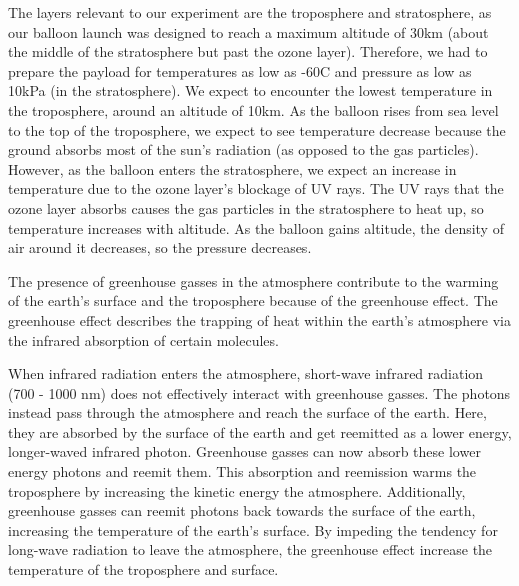 \documentclass[12pt,]{article}
\begin{document}
The layers relevant to our experiment are the troposphere and
stratosphere, as our balloon launch was designed to reach a maximum
altitude of 30km (about the middle of the stratosphere but past the
ozone layer). Therefore, we had to prepare the payload for temperatures
as low as -60C and pressure as low as 10kPa (in the stratosphere). We
expect to encounter the lowest temperature in the troposphere, around an
altitude of 10km. As the balloon rises from sea level to the top of the
troposphere, we expect to see temperature decrease because the ground
absorbs most of the sun's radiation (as opposed to the gas particles).
However, as the balloon enters the stratosphere, we expect an increase
in temperature due to the ozone layer's blockage of UV rays. The UV rays
that the ozone layer absorbs causes the gas particles in the
stratosphere to heat up, so temperature increases with altitude. As the
balloon gains altitude, the density of air around it decreases, so the
pressure decreases.

The presence of greenhouse gasses in the atmosphere contribute to the
warming of the earth's surface and the troposphere because of the
greenhouse effect. The greenhouse effect describes the trapping of heat
within the earth's atmosphere via the infrared absorption of certain
molecules.

When infrared radiation enters the atmosphere, short-wave infrared
radiation (700 - 1000 nm) does not effectively interact with greenhouse
gasses. The photons instead pass through the atmosphere and reach the
surface of the earth. Here, they are absorbed by the surface of the
earth and get reemitted as a lower energy, longer-waved infrared photon.
Greenhouse gasses can now absorb these lower energy photons and reemit
them. This absorption and reemission warms the troposphere by increasing
the kinetic energy the atmosphere. Additionally, greenhouse gasses can
reemit photons back towards the surface of the earth, increasing the
temperature of the earth's surface. By impeding the tendency for
long-wave radiation to leave the atmosphere, the greenhouse effect
increase the temperature of the troposphere and surface.
\end{document}
